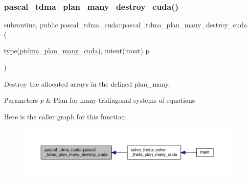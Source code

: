 \subsubsection{\texorpdfstring{pascal\+\_\+tdma\+\_\+plan\+\_\+many\+\_\+destroy\+\_\+cuda()}{pascal\_tdma\_plan\_many\_destroy\_cuda()}}
{\footnotesize\ttfamily subroutine, public pascal\+\_\+tdma\+\_\+cuda\+::pascal\+\_\+tdma\+\_\+plan\+\_\+many\+\_\+destroy\+\_\+cuda (\begin{DoxyParamCaption}\item[{type(\hyperlink{structpascal__tdma__cuda_1_1ptdma__plan__many__cuda}{ptdma\+\_\+plan\+\_\+many\+\_\+cuda}), intent(inout)}]{p }\end{DoxyParamCaption})}



Destroy the allocated arrays in the defined plan\+\_\+many. 


\begin{DoxyParams}{Parameters}
{\em p} & Plan for many tridiagonal systems of equations \\
\hline
\end{DoxyParams}
Here is the caller graph for this function\+:
\nopagebreak
\begin{figure}[H]
\begin{center}
\leavevmode
\includegraphics[width=350pt]{namespacepascal__tdma__cuda_a70734ba15cf5a093ac3ba2ccbc4f5330_icgraph}
\end{center}
\end{figure}
